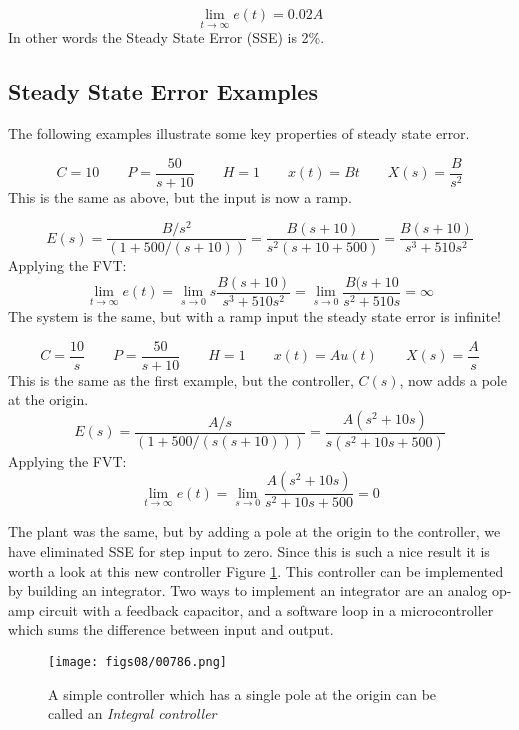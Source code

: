 \[
\lim_{t\to\infty} e(t) =  0.02A
\]
In other words the Steady State Error (SSE) is 2\%.



\subsection{Steady State Error Examples} 

The following examples illustrate some key properties of steady state error. 

\begin{ExampleSmall}
\[
C = 10 \qquad P = \frac{50}{s+10} \qquad H = 1 \qquad x(t) = Bt \qquad X(s) = \frac{B}{s^2}
\]
This is the same as above, but the input is now a ramp.

\[
E(s) = \frac{B/s^2}{(1+500/(s+10))} = \frac{B(s+10)}{s^2(s+10+500)}= \frac{B(s+10)}{s^3+510s^2} 
\]
Applying the FVT:
\[
\lim_{t\to\infty} e(t) = \lim_{s\to 0} s\frac{B(s+10)}{s^3+510s^2} = \lim_{s\to 0} \frac{B(s+10}{s^2+510s} = \infty
\]
The system is the same, but with a ramp input the steady state error is infinite!

\end{ExampleSmall}



\begin{ExampleSmall}\label{ExIntwRamp}

\[
C = \frac{10}{s} \qquad P = \frac{50}{s+10} \qquad H = 1 \qquad x(t) = Au(t) \qquad X(s) = \frac{A}{s}
\]
This is the same as the first example, but the controller, $C(s)$, now adds a pole at the origin.
 \[
E(s) = \frac{A/s}{(1+500/(s(s+10)))} = \frac{A(s^2+10s)}{s(s^2+10s+500)} 
\]
Applying the FVT:
\[
\lim_{t\to\infty} e(t) = \lim_{s\to 0} \frac{A(s^2+10s)}{s^2+10s+500} = 0
\]

The plant was the same, but by adding a pole at the  origin to the controller, we have eliminated SSE for step input to zero. 
Since this is such a nice result it is worth a look at this new controller Figure \ref{SimpleIntegralController}. 
This controller can be implemented by building an integrator.  Two ways to implement an integrator are an analog op-amp circuit with a feedback capacitor, and a software loop in a microcontroller which sums the difference between input and output. 

\end{ExampleSmall}


\begin{figure}\centering
\texttt{[image: figs08/00786.png]}
\caption{A simple controller which has a single pole at the origin can be called an {\it Integral controller}}\label{SimpleIntegralController}
\end{figure}
 
